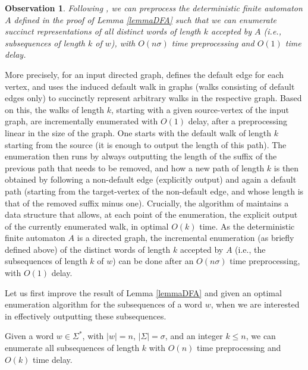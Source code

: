 \documentclass[runningheads,UKenglish,cleveref, autoref, thm-restate]{llncs}
\newtheorem{observation}{Observation}
\begin{document}
\begin{observation}
Following \cite{AdamsonGM24}, we can preprocess the deterministic finite automaton $A$ defined in the proof of Lemma \ref{lemmaDFA} such that we can enumerate succinct representations of all distinct words of length $k$ accepted by $A$ (i.e., subsequences of length $k$ of $w$), with $O(n \sigma)$ time preprocessing and $O(1)$ time delay. 
\end{observation}

More precisely, for an input directed graph, \cite{AdamsonGM24} defines the default edge for each vertex, and uses the induced default walk in graphs (walks consisting of default edges only) to succinctly represent arbitrary walks in the respective graph. Based on this, the walks of length $k$, starting with a given source-vertex of the input graph, are incrementally enumerated with $O(1)$ delay, after a preprocessing linear in the size of the graph. One starts with the default walk of length $k$ starting from the source (it is enough to output the length of this path). The enumeration then runs by always outputting the length of the suffix of the previous path that needs to be removed, and how a new path of length $k$ is then obtained by following a non-default edge (explicitly output) and again a default path (starting from the target-vertex of the non-default edge, and whose length is that of the removed suffix minus one). Crucially, the algorithm of \cite{AdamsonGM24}  maintains a data structure that allows, at each point of the enumeration, the explicit output of the currently enumerated walk, in optimal $O(k)$ time. As the deterministic finite automaton $A$ is a directed graph, the incremental enumeration (as briefly defined above) of the distinct words of length $k$ accepted by $A$ (i.e., the subsequences of length $k$ of $w$) can be done after an $O(n\sigma)$ time preprocessing, with $O(1)$ delay. 

Let us first improve the result of Lemma \ref{lemmaDFA} and given an optimal enumeration algorithm for the subsequences of a word $w$, when we are interested in effectively outputting these subsequences.
\begin{theorem}\label{lemmaRMQ}
Given a word $w \in \Sigma^*$, with $|w|=n$, $|\Sigma|=\sigma$, and an integer $k \leq n$, we can enumerate all subsequences of length $k$ with $O(n)$ time preprocessing and $O(k)$ time delay.
\end{theorem}
\end{document}
